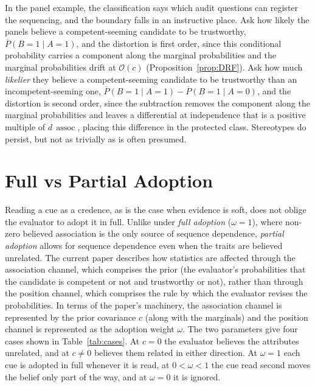 \documentclass[a4paper,fleqn]{cas-sc}
\theoremstyle{remark}
\theoremstyle{definition}
\newcommand{\Pbar}{\overline{P}}
\newcommand{\assoc}{\operatorname{assoc}}
\newcommand{\bigO}{\mathcal{O}}
\begin{document}
In the panel example, the classification says which audit questions can register the sequencing, and
the boundary falls in an instructive place. Ask how likely the panels believe a
competent-seeming candidate to be trustworthy, $\Pbar(B{=}1\mid A{=}1)$, and the distortion is
first order, since this conditional probability carries a component along the marginal
probabilities and the marginal probabilities drift at $\bigO(c)$ (Proposition~\ref{prop:DRF}).
Ask how much \emph{likelier} they believe a competent-seeming candidate to be trustworthy than
an incompetent-seeming one, $\Pbar(B{=}1\mid A{=}1)-\Pbar(B{=}1\mid A{=}0)$, and the distortion
is second order, since the subtraction removes the component along the marginal probabilities
and leaves a differential at independence that is a positive multiple of $d\,\assoc$, placing
this difference in the protected class. Stereotypes do persist, but not as trivially as is often presumed.

\section{Full vs Partial Adoption}
\label{sec:partial}

Reading a cue as a credence, as is the case when evidence is soft, does not oblige the
evaluator to adopt it in full. Unlike under \emph{full adoption} ($\omega=1$), where non-zero believed association is the only source of sequence dependence, \emph{partial adoption} allows for sequence dependence even when the traits are believed unrelated. The current paper describes how statistics are affected through the association channel, which comprises the
prior (the evaluator's probabilities that the candidate is competent or not and trustworthy
or not), rather than through the position channel, which comprises the rule by which the
evaluator revises the probabilities. In terms of the paper's machinery, the association channel is represented by the prior covariance $c$ (along with the marginals) and the position channel is represented as the adoption weight $\omega$. The two parameters give four cases shown in Table~\ref{tab:cases}. At $c=0$ the evaluator believes the attributes unrelated, and at $c\neq0$ believes them related in either direction. At $\omega=1$ each cue is adopted in full whenever it is read, at $0<\omega<1$ the cue read second moves the belief only part of the way, and at $\omega=0$ it is ignored. 
\end{document}
